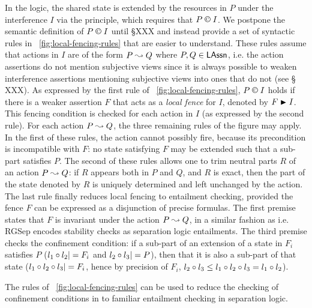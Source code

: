 In the logic, the shared state is extended by the resources in $P$ under
the interference $I$ via the \extendRule principle, which requires
that $P\containI I$. We postpone the semantic definition of $P \confines I$ until \S XXX and instead provide a set of syntactic rules in \fig~\ref{fig:local-fencing-rules} that are easier to understand.
These rules assume that actions in
$I$ are of the form $P \mathrel{\leadsto} Q$ where
$P,Q\in\mathsf{LAssn}$, i.e. the action assertions do not
mention subjective views since it is always possible to weaken
interference assertions mentioning subjective views into ones that do not (see \S
XXX). As expressed by the first rule of
\fig~\ref{fig:local-fencing-rules}, $P\containI I$ holds if there is a
weaker assertion $F$ that acts as a \emph{local fence} for $I$,
denoted by $F\strictfences I$. This fencing condition is checked for
each action in $I$ (as expressed by the second rule). For each action
$P\mathrel{\leadsto} Q$, the three remaining rules of the figure may apply. In the
first of these rules, the action cannot possibly fire, because its
precondition is incompatible with $F$: no state satisfying $F$ may be
extended such that a sub-part satisfies $P$. The second of these rules
allows one to trim neutral parts $R$ of an action $P\mathrel{\leadsto} Q$: if $R$
appears both in $P$ and $Q$, and $R$ is exact, then the part of the
state denoted by $R$ is uniquely determined and left unchanged by the
action. The last rule finally reduces local fencing to entailment
checking, provided the fence $F$ can be expressed as a disjunction of
precise formulas. The first premise states that $F$ is invariant under
the action $P\mathrel{\leadsto} Q$, in a similar fashion as i.e. RGSep
encodes stability checks as separation logic entailments. The third
premise checks the confinement condition: if a sub-part of an
extension of a state in $F_i$ satisfies $P$ ($l_1\circ l_2|= F_i$
and $l_2\circ l_3 |= P$), then that it is also a sub-part of that
state ($l_1\circ l_2\circ l_3|=F_i$, hence by precision of
$F_i$, $l_2\circ l_3\leq l_1\circ l_2\circ l_3 =
l_1\circ l_2$).

The rules of \fig~\ref{fig:local-fencing-rules} can be used to reduce
the checking of confinement conditions in \colosl to familiar
entailment checking in separation logic.

